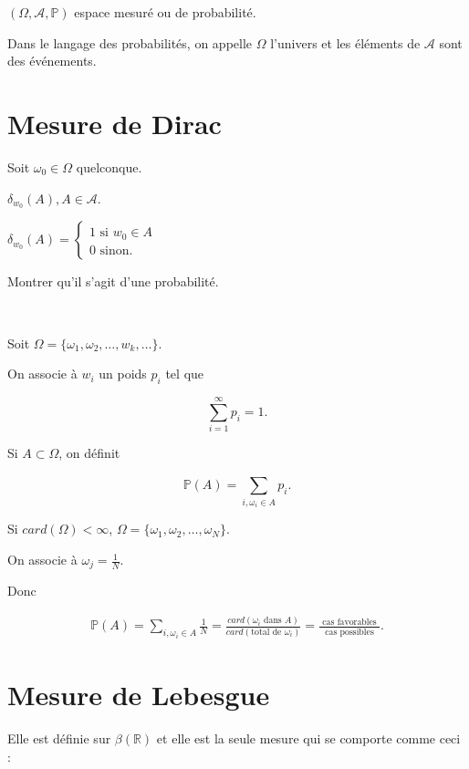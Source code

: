\documentclass[french]{book}
\theoremstyle{definition}
\theoremstyle{remark}
\newcommand{\lesss}{<}
\newcommand{\less}{\lesss}
\begin{document}
$(\Omega, \mathscr{A}, \mathbb{P} )$ espace mesuré ou de probabilité.

Dans le langage des probabilités, on appelle $\Omega$ l'univers et les éléments de $\mathscr{A} $ sont des événements.

\section{Mesure de Dirac}

Soit $\omega _{0} \in \Omega$ quelconque.

$\delta  _{w_0}(A), A \in \mathscr{A} $.

$\delta _{w_0}(A) =
 \begin{cases}
  1 \text{ si } w_0 \in A \\
  0 \text{ sinon}.
\end{cases}$

Montrer qu'il s'agit d'une probabilité.

\

 Soit $\Omega = \{ \omega_1, \omega_2, \dots, w_k, \dots \} $.

 On associe à $w_i$ un poids $p_i$ tel que

 \begin{equation}
   \sum_{i=1}^{\infty} p_i = 1.
 \end{equation}

 Si $A \subset \Omega$, on définit

 \begin{equation*}
   \mathbb{P}( A ) = \sum_{i,  \omega_i \in A}^{} p_i.
 \end{equation*}

 Si $card(\Omega) \less \infty$, $\Omega = \{ \omega_1, \omega_2, \dots, \omega _{N} \} $.

 On associe à $\omega _{j} = \frac{1}{N}$.

 Donc

 \begin{gather*}
   \mathbb{P}( A ) = \sum_{i, \omega_i \in A}^{} \frac{1}{N} = \frac{card(\omega_i \text{ dans } A)}{card(\text{total de } \omega_i )} = \frac{\text{ cas favorables } }{\text{ cas possibles } }.
 \end{gather*}

\section{Mesure de Lebesgue}

Elle est définie sur $\beta (\mathbb{R})$ et elle est la seule mesure qui se comporte comme ceci :
\end{document}
